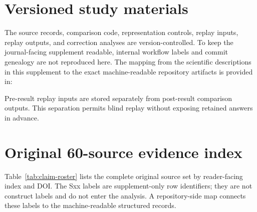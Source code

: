 \documentclass[11pt]{article}
\begin{document}
\section{Versioned study materials}

The source records, comparison code, representation controls, replay inputs, replay outputs, and correction analyses are version-controlled. To keep the journal-facing supplement readable, internal workflow labels and commit genealogy are not reproduced here. The mapping from the scientific descriptions in this supplement to the exact machine-readable repository artifacts is provided in:

\begin{center}
\end{center}

Pre-result replay inputs are stored separately from post-result comparison outputs. This separation permits blind replay without exposing retained answers in advance.

\section{Original 60-source evidence index}

Table~\ref{tab:claim-roster} lists the complete original source set by reader-facing index and DOI. The Sxx labels are supplement-only row identifiers; they are not construct labels and do not enter the analysis. A repository-side map connects these labels to the machine-readable structured records.
\end{document}
